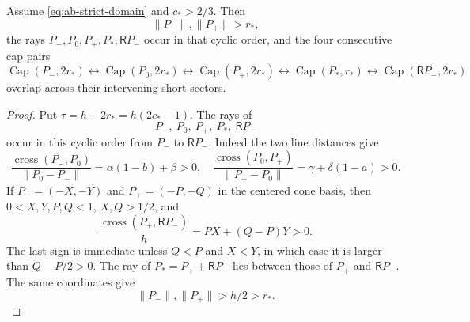 \begin{proposition}
\label{prop:technical-four-overlaps}
Assume \eqref{eq:ab-strict-domain} and $c_*>2/3$.  Then
\[
 \lVert P_-\rVert,\lVert P_+\rVert>r_*,
\]
the rays $P_-,P_0,P_+,P_*,\mathsf R P_-$ occur in that cyclic order, and the
four consecutive
cap pairs
\[
 \operatorname{Cap}(P_-,2r_*)
 \leftrightarrow\operatorname{Cap}(P_0,2r_*)
 \leftrightarrow\operatorname{Cap}(P_+,2r_*)
 \leftrightarrow\operatorname{Cap}(P_*,r_*)
 \leftrightarrow\operatorname{Cap}(\mathsf R P_-,2r_*)
\]
overlap across their intervening short sectors.
\end{proposition}

\begin{proof}

Put $\tau=h-2r_*=h(2c_*-1)$.  The rays of
\begin{equation}
 P_-,\ P_0,\ P_+,\ P_*,\ \mathsf R P_-          \label{eq:cap-ray-order}
\end{equation}
occur in this cyclic order from $P_-$ to $\mathsf R P_-$.  Indeed the two
line distances
give
\[
 \frac{\operatorname{cross}(P_-,P_0)}{\lVert P_0-P_-\rVert}
 =\alpha(1-b)+\beta>0,
 \quad
 \frac{\operatorname{cross}(P_0,P_+)}{\lVert P_+-P_0\rVert}
 =\gamma+\delta(1-a)>0.
\]
If $P_-=(-X,-Y)$ and $P_+=(-P,-Q)$ in the centered cone basis, then
$0<X,Y,P,Q<1$, $X,Q>1/2$, and
\[
 \frac{\operatorname{cross}(P_+,\mathsf R P_-)}h
 =PX+(Q-P)Y>0.
\]
The last sign is immediate unless $Q<P$ and $X<Y$, in which case it is
larger than $Q-P/2>0$.  The ray of
$P_*=P_++\mathsf R P_-$ lies between those of $P_+$ and
$\mathsf R P_-$.  The same coordinates give
\begin{equation}
 \lVert P_-\rVert,\lVert P_+\rVert>h/2>r_*.
 \label{eq:outer-radii}
\end{equation}


\end{proof}
